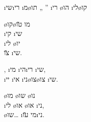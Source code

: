 \textheader%
{ \i{שי}\i{רי} \i{מ}\o{תו} „  ”}
{\i{רי} \o{הו}}
{}
{}
{\i{לי}\o{קו}}
{}
{}




\begin{twocol}
\begin{stanza}
 \o{קו}\o{מו} \u{טו} \\
\i{קי} \i{שי}\\
\i{לי} \o{יו} \\
\u{צו}  \i{שי}.
\end{stanza}

\begin{stanza}
, \i{מי} \i{הי}\i{רי} \i{שי},\\
\i{יי} \i{אי} \i{ני}\o{צו}\o{צו}  \i{שי}.
\end{stanza}

\begin{stanza}
\o{מו}  \o{שו} \o{נו}\\
\i{לי} \o{או} \o{או}  \i{ני},\\
\o{שו}… \i{מי} \u{עו}\i{ני}.
\end{stanza}
\end{twocol}




